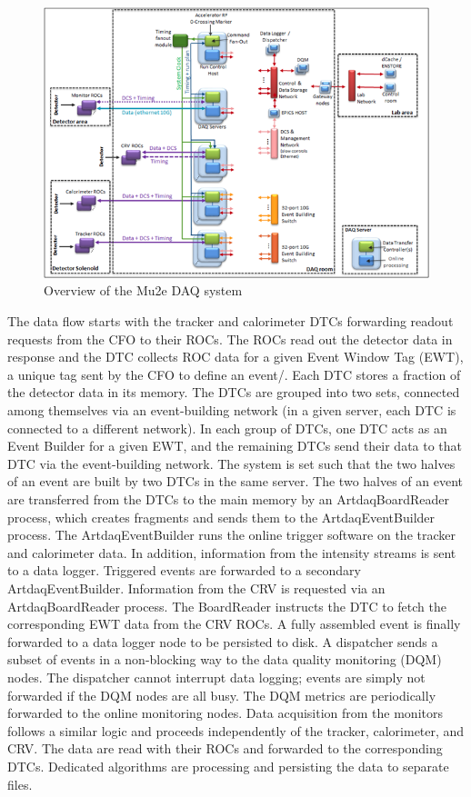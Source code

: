 \begin{figure}[htb]
\begin{center}
\includegraphics[width=0.9\linewidth]{figures/daq-overview.png}
\caption{Overview of the Mu2e DAQ system}
\label{fig:daqoverview}
\end{center}
\end{figure}

The data flow starts with the tracker and calorimeter DTCs forwarding readout requests from the CFO to their ROCs. The ROCs read out the detector data in response and the DTC collects ROC data for a given Event Window Tag (EWT), a unique tag sent by the CFO to define an event/. Each DTC stores a fraction of the detector data in its memory. The DTCs are grouped into two sets, connected among themselves via an event-building network (in a given server, each DTC is connected to a different network). In each group of DTCs, one DTC acts as an Event Builder for a given EWT, and the remaining DTCs send their data to that DTC via the event-building network. The system is set such that the two halves of an event are built by two DTCs in the same server. The two halves of an event are transferred from the DTCs to the main memory by an ArtdaqBoardReader process, which creates fragments and sends them to the ArtdaqEventBuilder process. The ArtdaqEventBuilder runs the online trigger software on the tracker and calorimeter data. In addition, information from the intensity streams is sent to a data logger. Triggered events are forwarded to a secondary ArtdaqEventBuilder. Information from the CRV is requested via an ArtdaqBoardReader process. The BoardReader instructs the DTC to fetch the corresponding EWT data from the CRV ROCs. A fully assembled event is finally forwarded to a data logger node to be persisted to disk. A dispatcher sends a subset of events in a non-blocking way to the data quality monitoring (DQM) nodes. The dispatcher cannot interrupt data logging; events are simply not forwarded if the DQM nodes are all busy. The DQM metrics are periodically forwarded to the online monitoring nodes. Data acquisition from the monitors follows a similar logic and proceeds independently of the tracker, calorimeter, and CRV. The data are read with their ROCs and forwarded to the corresponding DTCs. Dedicated algorithms are processing and persisting the data to separate files. 

